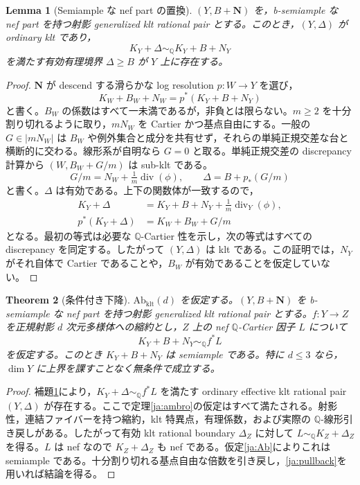 \documentclass[12pt]{amsart}
\newtheorem{thm}{Theorem}[section]
\newtheorem{lem}[thm]{Lemma}
\theoremstyle{definition}
\theoremstyle{remark}
\numberwithin{equation}{section}
\newcommand{\Div}{\operatorname{div}}
\newcommand{\Q}{\mathbb{Q}}
\newcommand{\bN}{\mathbf N}
\newcommand{\qs}{\sim_{\mathbb Q}}
\begin{document}
\begin{lem}[Semiample な nef part の置換]\label{ja:replacement}
$(Y,B+\bN)$ を，b-semiample な nef part を持つ射影 generalized klt rational pair とする。このとき，$(Y,\Delta)$ が ordinary klt であり，
\[
 K_Y+\Delta\qs K_Y+B+N_Y
\]
を満たす有効有理境界 $\Delta\geq B$ が $Y$ 上に存在する。
\end{lem}
\begin{proof}
$\bN$ が descend する滑らかな log resolution $p:W\to Y$ を選び，
\[
 K_W+B_W+N_W=p^*(K_Y+B+N_Y)
\]
と書く。$B_W$ の係数はすべて一未満であるが，非負とは限らない。$m\geq2$ を十分割り切れるように取り，$mN_W$ を Cartier かつ基点自由にする。一般の $G\in|mN_W|$ は $B_W$ や例外集合と成分を共有せず，それらの単純正規交差な台と横断的に交わる。線形系が自明なら $G=0$ と取る。単純正規交差の discrepancy 計算から $(W,B_W+G/m)$ は sub-klt である。
\[
 G/m=N_W+\tfrac1m\Div(\phi),\qquad
 \Delta=B+p_*(G/m)
\]
と書く。$\Delta$ は有効である。上下の関数体が一致するので，
\begin{align*}
 K_Y+\Delta
 &=K_Y+B+N_Y+\tfrac1m\Div_Y(\phi),\\
 p^*(K_Y+\Delta)
 &=K_W+B_W+G/m
\end{align*}
となる。最初の等式は必要な $\Q$-Cartier 性を示し，次の等式はすべての discrepancy を同定する。したがって $(Y,\Delta)$ は klt である。この証明では，$N_Y$ がそれ自体で Cartier であることや，$B_W$ が有効であることを仮定していない。
\end{proof}

\begin{thm}[条件付き下降]\label{ja:transfer}
$\mathrm{Ab}_{\mathrm{klt}}(d)$ を仮定する。$(Y,B+\bN)$ を b-semiample な nef part を持つ射影 generalized klt rational pair とする。$f:Y\to Z$ を正規射影 $d$ 次元多様体への縮約とし，$Z$ 上の nef $\Q$-Cartier 因子 $L$ について
\begin{equation}\label{ja:pullback}
 K_Y+B+N_Y\qs f^*L
\end{equation}
を仮定する。このとき $K_Y+B+N_Y$ は semiample である。特に $d\leq3$ なら，$\dim Y$ に上界を課すことなく無条件で成立する。
\end{thm}
\begin{proof}
補題\ref{ja:replacement}により，$K_Y+\Delta\qs f^*L$ を満たす ordinary effective klt rational pair $(Y,\Delta)$ が存在する。ここで定理\ref{ja:ambro}の仮定はすべて満たされる。射影性，連結ファイバーを持つ縮約，klt 特異点，有理係数，および実際の $\Q$-線形引き戻しがある。したがって有効 klt rational boundary $\Delta_Z$ に対して $L\qs K_Z+\Delta_Z$ を得る。$L$ は nef なので $K_Z+\Delta_Z$ も nef である。仮定\ref{ja:Ab}によりこれは semiample である。十分割り切れる基点自由な倍数を引き戻し，\eqref{ja:pullback}を用いれば結論を得る。
\end{proof}
\end{document}
